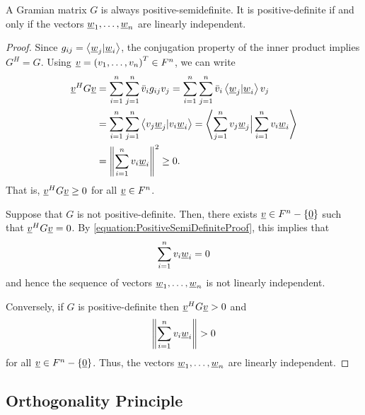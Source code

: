 \begin{theorem}
A Gramian matrix $G$ is always positive-semidefinite.
It is positive-definite if and only if the vectors $\underline{w}_1, \ldots, \underline{w}_n$ are linearly independent.
\end{theorem}
\begin{proof}
Since $g_{ij} = \left\langle \underline{w}_j | \underline{w}_i \right\rangle$, the conjugation property of the inner product implies $G^H = G$.
Using $\underline{v} = \left( v_1, \ldots, v_n \right)^T \in F^n$, we can write
\begin{equation} \label{equation:PositiveSemiDefiniteProof}
\begin{split}
\underline{v}^H G \underline{v} &=
\sum_{i=1}^n \sum_{j=1}^n \bar{v}_i g_{ij} v_j
= \sum_{i=1}^n \sum_{j=1}^n \bar{v}_i \left\langle \underline{w}_j | \underline{w}_i \right\rangle v_j \\
&= \sum_{i=1}^n \sum_{j=1}^n \left\langle v_j \underline{w}_j | v_i \underline{w}_i \right\rangle
= \left\langle \sum_{j=1}^n v_j \underline{w}_j \Big| \sum_{i=1}^n v_i \underline{w}_i \right\rangle \\
&= \left\| \sum_{i=1}^n v_i \underline{w}_i \right\|^2
\geq 0.
\end{split}
\end{equation}
That is, $\underline{v}^H G \underline{v} \geq 0$ for all $\underline{v} \in F^n$.

Suppose that $G$ is not positive-definite.
Then, there exists $\underline{v} \in F^n - \left\{ \underline{0} \right\}$ such that $\underline{v}^H G \underline{v} = 0$.
By \eqref{equation:PositiveSemiDefiniteProof}, this implies that
\begin{equation*}
\sum_{i=1}^n v_i \underline{w}_i = 0
\end{equation*}
and hence the sequence of vectors $\underline{w}_1, \ldots, \underline{w}_n$ is not linearly independent.

Conversely, if $G$ is positive-definite then $\underline{v}^H G \underline{v} > 0$ and
\begin{equation*}
\left\| \sum_{i=1}^n v_i \underline{w}_i \right\| > 0
\end{equation*}
for all $\underline{v} \in F^n - \left\{ \underline{0} \right\}$.
Thus, the vectors $\underline{w}_1, \ldots, \underline{w}_n$ are linearly independent.
\end{proof}


\subsection{Orthogonality Principle}

